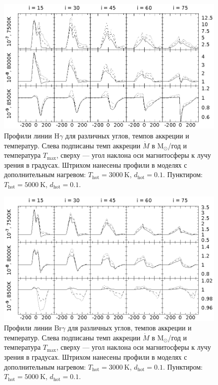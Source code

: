 \documentclass[12pt]{article}
\begin{document}
\begin{figure}[h]
\centering
\includegraphics[width=\textwidth]{hot_5_Hg.eps}
\caption{Профили линии $\text{H}\gamma$ для различных углов, темпов аккреции и температур. Слева подписаны темп аккреции $\dot{M}$ в $\text{M}_\odot$/год и температура $T_\text{max}$, сверху --- угол наклона оси магнитосферы к лучу зрения в градусах. Штрихом нанесены профили в моделях с дополнительным нагревом: $T_\text{hot} = 3000\ \text{K}$, $d_\text{hot} = 0.1$. Пунктиром: $T_\text{hot} = 5000\ \text{K}$, $d_\text{hot} = 0.1$.}
\label{fig:Hg}
\end{figure}

\begin{figure}[h]
\centering
\includegraphics[width=\textwidth]{hot_5_Brg.eps}
\caption{Профили линии $\text{Br}\gamma$ для различных углов, темпов аккреции и температур. Слева подписаны темп аккреции $\dot{M}$ в $\text{M}_\odot$/год и температура $T_\text{max}$, сверху --- угол наклона оси магнитосферы к лучу зрения в градусах. Штрихом нанесены профили в моделях с дополнительным нагревом: $T_\text{hot} = 3000\ \text{K}$, $d_\text{hot} = 0.1$. Пунктиром: $T_\text{hot} = 5000\ \text{K}$, $d_\text{hot} = 0.1$.}
\label{fig:Brg}
\end{figure}
\FloatBarrier
\end{document}
